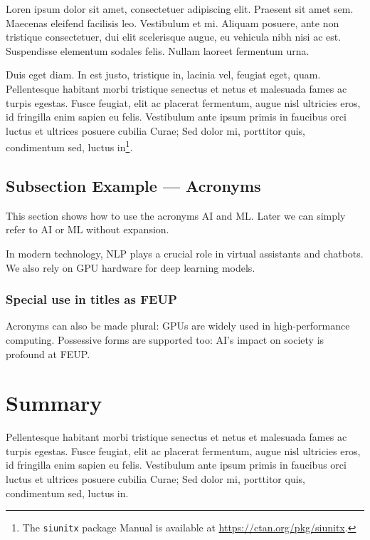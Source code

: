 Loren ipsum dolor sit amet, consectetuer adipiscing elit. 
Praesent sit amet sem. Maecenas eleifend facilisis leo. Vestibulum et
mi. Aliquam posuere, ante non tristique consectetuer, dui elit
scelerisque augue, eu vehicula nibh nisi ac est. Suspendisse elementum
sodales felis. Nullam laoreet fermentum urna. 

Duis eget diam. In est justo, tristique in, lacinia vel, feugiat eget,
quam. Pellentesque habitant morbi tristique senectus et netus et
malesuada fames ac turpis egestas. Fusce feugiat, elit ac placerat
fermentum, augue nisl ultricies eros, id fringilla enim sapien eu
felis. Vestibulum ante ipsum primis in faucibus orci luctus et
ultrices posuere cubilia Curae; Sed dolor mi, porttitor quis,
condimentum sed, luctus in\footnote{The \texttt{siunitx} package Manual is available at \url{https://ctan.org/pkg/siunitx}.}.

\subsection{Subsection Example --- Acronyms} \label{sec:acronym}

This section shows how to use the acronyms \ac{AI} and \ac{ML}.  
Later we can simply refer to \ac{AI} or \ac{ML} without expansion.

In modern technology, \ac{NLP} plays a crucial role in virtual assistants 
and chatbots.  
We also rely on \ac{GPU} hardware for deep learning models.

\subsubsection{Special use in titles as \acs*{FEUP}}

Acronyms can also be made plural: \acp{GPU} are widely used in 
high-performance computing.  
Possessive forms are supported too: \ac{AI}'s impact on society is 
profound at \ac{FEUP}.

\section{Summary}

Pellentesque habitant morbi tristique senectus et netus et
malesuada fames ac turpis egestas. Fusce feugiat, elit ac placerat
fermentum, augue nisl ultricies eros, id fringilla enim sapien eu
felis. Vestibulum ante ipsum primis in faucibus orci luctus et
ultrices posuere cubilia Curae; Sed dolor mi, porttitor quis,
condimentum sed, luctus in. 
